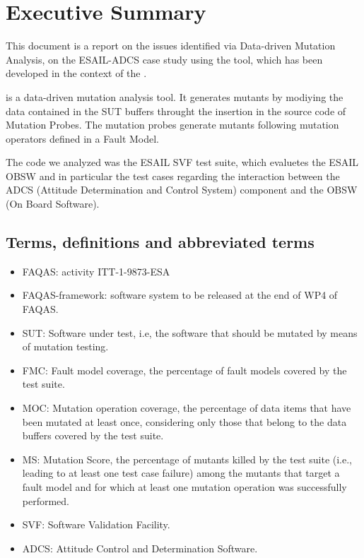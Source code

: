 
\chapter{Executive Summary}

This document is a report on the issues identified via Data-driven Mutation Analysis, on the ESAIL-ADCS case study using the \DAMA tool, which has been developed in the context of the \FAQAS.

\DAMA is a data-driven mutation analysis tool. It generates mutants by modiying the data contained in the SUT buffers throught the insertion in the source code of Mutation Probes. The mutation probes generate mutants following mutation operators defined in a Fault Model.

The code we analyzed was the ESAIL SVF test suite, which evaluetes the ESAIL OBSW and in particular the test cases regarding the interaction between the ADCS (Attitude Determination and Control System) component and the OBSW (On Board Software).


\section{Terms, definitions and abbreviated terms}

\begin{itemize}
\item{FAQAS}: activity ITT-1-9873-ESA
\item{FAQAS-framework}: software system to be released at the end of WP4 of FAQAS.
\item{SUT}: Software under test, i.e, the software that should be mutated by means of mutation testing.
\item{FMC}: Fault model coverage, the percentage of fault models covered by the test suite.
\item{MOC}: Mutation operation coverage, the percentage of data items that have been mutated at least once, considering only those that belong to the data buffers covered by the test suite.
\item{MS}: Mutation Score, the percentage of mutants killed by the test suite (i.e., leading to at least one test case failure) among the mutants that target a fault model and for which at least one mutation operation was successfully performed.
\item{SVF}: Software Validation Facility.
\item{ADCS}: Attitude Control and Determination Software.

\end{itemize}

\clearpage

